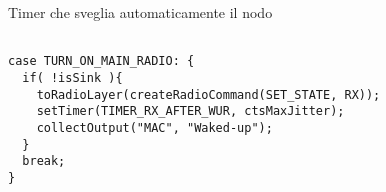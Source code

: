 \begin{listing}[h]
    \caption{Timer che sveglia automaticamente il nodo}
    \label{code:turnOff}
    \begin{verbatim}

case TURN_ON_MAIN_RADIO: {
  if( !isSink ){
    toRadioLayer(createRadioCommand(SET_STATE, RX));
    setTimer(TIMER_RX_AFTER_WUR, ctsMaxJitter);
    collectOutput("MAC", "Waked-up");
  }
  break;
}

    \end{verbatim}
\end{listing}